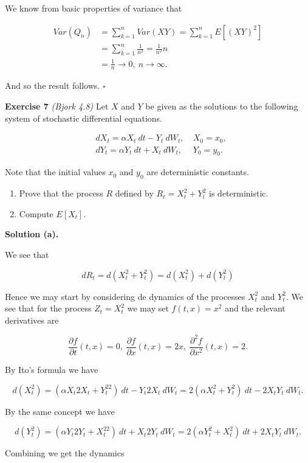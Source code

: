 \documentclass[
]{book}
\providecommand{\tightlist}{%
  \setlength{\itemsep}{0pt}\setlength{\parskip}{0pt}}
\begin{document}
We know from basic properties of variance that

\begin{align*}
Var(Q_n)&=\sum_{k=1}^n Var(XY)=\sum_{k=1}^n E[(XY)^2]\\
&=\sum_{k=1}^n\frac{1}{n^2}=\frac{1}{n^2}n\\
&=\frac{1}{n}\to0,\ n\to\infty.
\end{align*}

And so the result follows. \(\square\)

\textbf{Exercise 7} \emph{(Bjork 4.8)} Let \(X\) and \(Y\) be given as the solutions to the following system of stochastic differential equations.

\begin{align*}
&dX_t=\alpha X_t\ dt-Y_t\ dW_t,\ &X_0=x_0,\\
&dY_t=\alpha Y_t\ dt + X_t\ dW_t,\ &Y_0=y_0.
\end{align*}

Note that the initial values \(x_0\) and \(y_0\) are deterministic constants.

\begin{enumerate}
\def\labelenumi{\alph{enumi}.}
\tightlist
\item
  Prove that the process \(R\) defined by \(R_t=X_t^2+Y_t^2\) is deterministic.
\item
  Compute \(E[X_t]\).
\end{enumerate}

\textbf{Solution (a).}

We see that

\[
dR_t=d(X_t^2+Y_t^2)=d(X_t^2)+d(Y_t^2)
\]

Hence we may start by considering de dynamics of the processes \(X_t^2\) and \(Y_t^2\). We see that for the process \(Z_t=X_t^2\) we may set \(f(t,x)=x^2\) and the relevant derivatives are

\[
\frac{\partial f}{\partial t}(t,x)=0,\ \frac{\partial f}{\partial x}(t,x)=2x,\ \frac{\partial^2 f}{\partial x^2}(t,x)=2.
\]

By Ito's formula we have

\[
d(X_t^2)=\left(\alpha X_t2X_t+Y_t^22\right)\ dt-Y_t2X_t\ dW_t=2(\alpha X_t^2+Y_t^2)\ dt-2X_tY_t\ dW_t.
\]

By the same concept we have

\[
d(Y_t^2)=\left(\alpha Y_t2Y_t+X_t^22\right)\ dt+X_t2Y_t\ dW_t=2(\alpha Y_t^2+X_t^2)\ dt+2X_tY_t\ dW_t.
\]

Combining we get the dynamics
\end{document}
